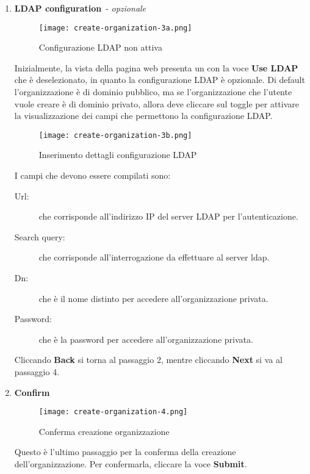 \documentclass[../manuale-utente.tex]{subfiles}
\begin{document}
\begin{enumerate}
    \item \textbf{LDAP configuration}~- \textit{opzionale}

    \begin{figure}[H]
      \centering
      \texttt{[image: create-organization-3a.png]}
      \caption{Configurazione LDAP non attiva}%
      \label{fig:web_app_configurazione_ldap_non_attiva}
    \end{figure}
    Inizialmente, la vista della pagina web presenta un  con la voce \textbf{Use LDAP} che è deselezionato, in quanto la configurazione LDAP è opzionale.
    Di default l'organizzazione è di dominio pubblico, ma se l'organizzazione che l'utente vuole creare è di dominio privato, allora deve cliccare sul toggle per attivare la visualizzazione dei campi che permettono la configurazione LDAP\@.
    \begin{figure}[H]
      \centering
      \texttt{[image: create-organization-3b.png]}
      \caption{Inserimento dettagli configurazione LDAP}%
      \label{fig:web_app_inserimento_dettagli_configurazione_ldap}
    \end{figure}
    I campi che devono essere compilati sono:
    \begin{description}
      \item[Url:] che corrisponde all'indirizzo IP del server LDAP per l'autenticazione.
      \item[Search query:]  che corrisponde all'interrogazione da effettuare al server ldap.
      \item[Dn:] che è il nome distinto per accedere all'organizzazione privata.
      \item[Password:] che è la password per accedere all'organizzazione privata.
  \end{description}
    Cliccando \textbf{Back} si torna al passaggio 2, mentre cliccando \textbf{Next} si va al passaggio 4.

    \item \textbf{Confirm}

    \begin{figure}[H]
        \centering
        \texttt{[image: create-organization-4.png]}
        \caption{Conferma creazione organizzazione}%
        \label{fig:web_app_conferma_organizzazione}
    \end{figure}
    Questo è l'ultimo passaggio per la conferma della creazione dell'organizzazione. Per confermarla, cliccare la voce \textbf{Submit}.
\end{enumerate}
\end{document}
